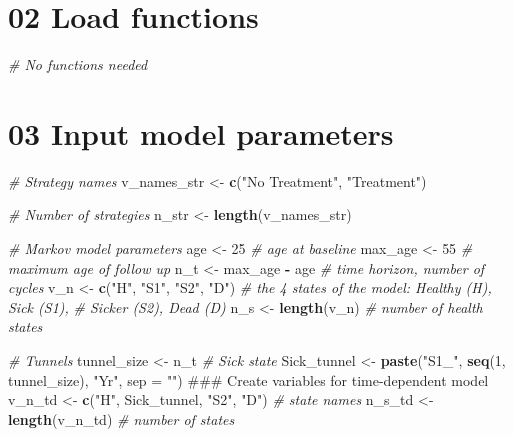 \documentclass[]{article}
\newenvironment{Shaded}{\begin{snugshade}}{\end{snugshade}}
\newcommand{\KeywordTok}[1]{\textcolor[rgb]{0.13,0.29,0.53}{\textbf{#1}}}
\newcommand{\DataTypeTok}[1]{\textcolor[rgb]{0.13,0.29,0.53}{#1}}
\newcommand{\DecValTok}[1]{\textcolor[rgb]{0.00,0.00,0.81}{#1}}
\newcommand{\StringTok}[1]{\textcolor[rgb]{0.31,0.60,0.02}{#1}}
\newcommand{\CommentTok}[1]{\textcolor[rgb]{0.56,0.35,0.01}{\textit{#1}}}
\newcommand{\OperatorTok}[1]{\textcolor[rgb]{0.81,0.36,0.00}{\textbf{#1}}}
\newcommand{\NormalTok}[1]{#1}
\begin{document}
\section{02 Load functions}\label{load-functions}

\begin{Shaded}
\begin{Highlighting}[]
\CommentTok{# No functions needed}
\end{Highlighting}
\end{Shaded}

\section{03 Input model parameters}\label{input-model-parameters}

\begin{Shaded}
\begin{Highlighting}[]
\CommentTok{# Strategy names}
\NormalTok{v_names_str <-}\StringTok{ }\KeywordTok{c}\NormalTok{(}\StringTok{"No Treatment"}\NormalTok{, }\StringTok{"Treatment"}\NormalTok{) }

\CommentTok{# Number of strategies}
\NormalTok{n_str <-}\StringTok{ }\KeywordTok{length}\NormalTok{(v_names_str)}

\CommentTok{# Markov model parameters}
\NormalTok{age     <-}\StringTok{ }\DecValTok{25}                       \CommentTok{# age at baseline}
\NormalTok{max_age <-}\StringTok{ }\DecValTok{55}                       \CommentTok{# maximum age of follow up}
\NormalTok{n_t     <-}\StringTok{ }\NormalTok{max_age }\OperatorTok{-}\StringTok{ }\NormalTok{age            }\CommentTok{# time horizon, number of cycles}
\NormalTok{v_n     <-}\StringTok{ }\KeywordTok{c}\NormalTok{(}\StringTok{"H"}\NormalTok{, }\StringTok{"S1"}\NormalTok{, }\StringTok{"S2"}\NormalTok{, }\StringTok{"D"}\NormalTok{)  }\CommentTok{# the 4 states of the model: Healthy (H), Sick (S1), }
                                    \CommentTok{# Sicker (S2), Dead (D)}
\NormalTok{n_s     <-}\StringTok{ }\KeywordTok{length}\NormalTok{(v_n)              }\CommentTok{# number of health states }

\CommentTok{# Tunnels}
\NormalTok{tunnel_size <-}\StringTok{ }\NormalTok{n_t}
\CommentTok{# Sick state}
\NormalTok{Sick_tunnel <-}\StringTok{ }\KeywordTok{paste}\NormalTok{(}\StringTok{"S1_"}\NormalTok{, }\KeywordTok{seq}\NormalTok{(}\DecValTok{1}\NormalTok{, tunnel_size), }\StringTok{"Yr"}\NormalTok{, }\DataTypeTok{sep =} \StringTok{""}\NormalTok{)}
\NormalTok{### Create variables for time-dependent model}
\NormalTok{v_n_td      <-}\StringTok{ }\KeywordTok{c}\NormalTok{(}\StringTok{"H"}\NormalTok{, Sick_tunnel, }\StringTok{"S2"}\NormalTok{, }\StringTok{"D"}\NormalTok{)   }\CommentTok{# state names}
\NormalTok{n_s_td      <-}\StringTok{ }\KeywordTok{length}\NormalTok{(v_n_td)                   }\CommentTok{# number of states}


\end{Highlighting}
\end{Shaded}
\end{document}
